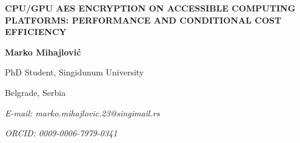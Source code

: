 \documentclass[11pt,b5paper]{article}
\begin{document}
\begin{titlepage}
\centering

\vspace*{2.5cm}

{\fontsize{13}{15}\selectfont\bfseries
CPU/GPU AES ENCRYPTION ON ACCESSIBLE COMPUTING PLATFORMS: PERFORMANCE AND CONDITIONAL COST EFFICIENCY
\par}

\vspace{1.8cm}

{\fontsize{10}{12}\selectfont\bfseries
Marko Mihajlović
\par}

\vspace{0.35cm}

{\fontsize{10}{12}\selectfont
PhD Student, Singidunum University
\par}

\vspace{0.35cm}

{\fontsize{10}{12}\selectfont
Belgrade, Serbia
\par}

\vspace{0.35cm}

{\fontsize{10}{12}\selectfont\itshape
E-mail: marko.mihajlovic.23@singimail.rs
\par}

\vspace{0.35cm}

{\fontsize{10}{12}\selectfont\itshape
ORCID: 0009-0006-7979-0341
\par}

\vfill

{\fontsize{10}{12}
\par}

\end{titlepage}
\end{document}
